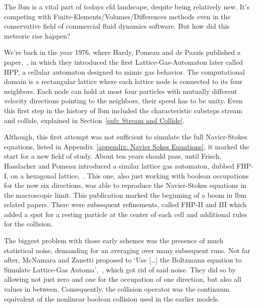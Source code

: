 
The \gls{lbm} is a vital part of todays \gls{cfd} landscape, despite being relatively new.
It's competing with Finite-Elements/Volumes/Differences methods even in the conservative field of commercial fluid dynamics software.
But how did this meteoric rise happen?

We're back in the year 1976, where Hardy, Pomeau and de Pazzis published a paper,~\cite{hardy1976molecular}, in which they introduced the first Lattice-Gas-Automaton later called HPP, a cellular automaton designed to mimic gas behavior.
The computational domain is a rectangular lattice where each lattice node is connected to its four neighbors.
Each node can hold at most four particles with mutually different velocity directions pointing to the neighbors, their speed has to be unity.
Even this first step in the history of \gls{lbm} included the characteristic substeps stream and collide, explained in Section~\ref{sub: Stream and Collide}.

Although, this first attempt was not sufficient to simulate the full Navier-Stokes equations, listed in Appendix~\ref{appendix: Navier Sokes Equations}, it marked the start for a new field of study.
About ten years should pass, until Frisch, Hasslacher and Pomeau introduced a similar lattice gas automaton, dubbed FHP-I, on a hexagonal lattice,~\cite{frisch1986lattice}.
This one, also just working with boolean occupations for the now six directions, was able to reproduce the Navier-Stokes equations in the macroscopic limit.
This publication marked the beginning of a boom in \gls{lbm} related papers.
There were subsequent refinements, called FHP-II and III which added a spot for a resting particle at the center of each cell and additional rules for the collision.

The biggest problem with those early schemes was the presence of much statistical noise, demanding for an averaging over many subsequent runs.
Not far after, McNamara and Zanetti proposed to `Use [\ldots] the Boltzmann equation to Simulate Lattice-Gas Automa',~\cite{PhysRevLett.61.2332}, which got rid of said noise.
They did so by allowing not just zero and one for the occupation of one direction, but also all values in between.
Consequently, the collision operator was the continuum equivalent of the nonlinear boolean collision used in the earlier models.

